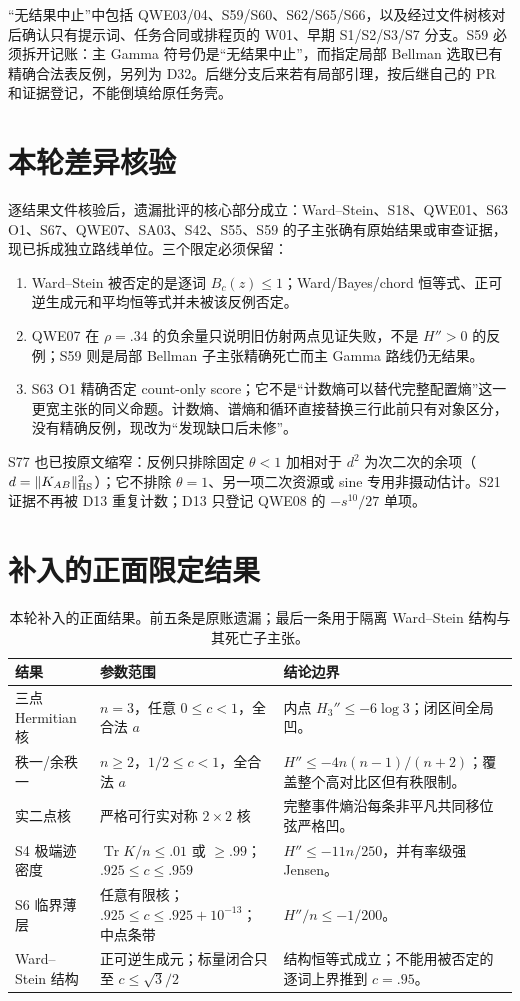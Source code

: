 \documentclass[UTF8,11pt]{ctexart}
\begin{document}
“无结果中止”中包括 QWE03/04、S59/S60、S62/S65/S66，以及经过文件树核对后确认只有提示词、任务合同或排程页的 W01、早期 S1/S2/S3/S7 分支。S59 必须拆开记账：主 Gamma 符号仍是“无结果中止”，而指定局部 Bellman 选取已有精确合法表反例，另列为 D32。后继分支后来若有局部引理，按后继自己的 PR 和证据登记，不能倒填给原任务壳。

\section{本轮差异核验}

逐结果文件核验后，遗漏批评的核心部分成立：Ward--Stein、S18、QWE01、S63 O1、S67、QWE07、SA03、S42、S55、S59 的子主张确有原始结果或审查证据，现已拆成独立路线单位。三个限定必须保留：
\begin{enumerate}
  \item Ward--Stein 被否定的是逐词 $B_c(z)\le1$；Ward/Bayes/chord 恒等式、正可逆生成元和平均恒等式并未被该反例否定。
  \item QWE07 在 $\rho=.34$ 的负余量只说明旧仿射两点见证失败，不是 $H''>0$ 的反例；S59 则是局部 Bellman 子主张精确死亡而主 Gamma 路线仍无结果。
  \item S63 O1 精确否定 count-only score；它不是“计数熵可以替代完整配置熵”这一更宽主张的同义命题。计数熵、谱熵和循环直接替换三行此前只有对象区分，没有精确反例，现改为“发现缺口后未修”。
\end{enumerate}

S77 也已按原文缩窄：反例只排除固定 $\theta<1$ 加相对于 $d^2$ 为次二次的余项（$d=\lVert K_{AB}\rVert_{\rm HS}^2$）；它不排除 $\theta=1$、另一项二次资源或 sine 专用非摄动估计。S21 证据不再被 D13 重复计数；D13 只登记 QWE08 的 $-s^{10}/27$ 单项。

\section{补入的正面限定结果}

\begin{table}[H]
\centering
\small
\begin{tabularx}{\textwidth}{p{2.4cm}p{5.5cm}Y}
\toprule
结果 & 参数范围 & 结论边界\\
\midrule
三点 Hermitian 核 & $n=3$，任意 $0\le c<1$，全合法 $a$ & 内点 $H_3''\le-6\log3$；闭区间全局凹。\\
秩一/余秩一 & $n\ge2$，$1/2\le c<1$，全合法 $a$ & $H''\le-4n(n-1)/(n+2)$；覆盖整个高对比区但有秩限制。\\
实二点核 & 严格可行实对称 $2\times2$ 核 & 完整事件熵沿每条非平凡共同移位弦严格凹。\\
S4 极端迹密度 & $\operatorname{Tr}K/n\le.01$ 或 $\ge.99$；$.925\le c\le.959$ & $H''\le-11n/250$，并有率级强 Jensen。\\
S6 临界薄层 & 任意有限核；$.925\le c\le.925+10^{-13}$；中点条带 & $H''/n\le-1/200$。\\
Ward--Stein 结构 & 正可逆生成元；标量闭合只至 $c\le\sqrt3/2$ & 结构恒等式成立；不能用被否定的逐词上界推到 $c=.95$。\\
\bottomrule
\end{tabularx}
\caption{本轮补入的正面结果。前五条是原账遗漏；最后一条用于隔离 Ward--Stein 结构与其死亡子主张。}
\end{table}
\end{document}
